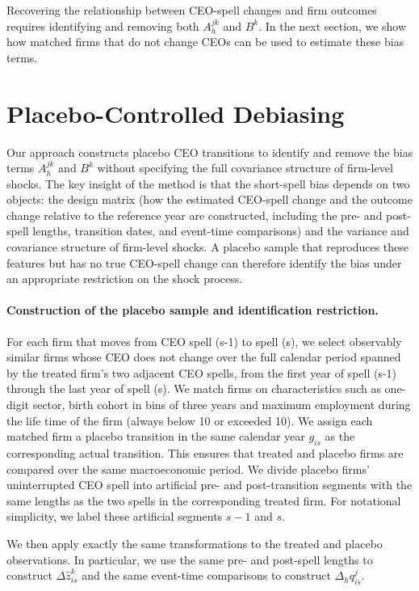 \documentclass[11pt,a4paper]{article}
\begin{document}
Recovering the relationship between CEO-spell changes and firm outcomes
requires identifying and removing both $A_h^{jk}$ and $B^{k}$. In the
next section, we show how matched firms that do not change CEOs can be
used to estimate these bias terms.


\section{Placebo-Controlled Debiasing}
\label{sec:placebo_debiasing}

Our approach constructs placebo CEO transitions to identify and remove
the bias terms $A_h^{jk}$ and $B^k$ without specifying the full
covariance structure of firm-level shocks. The key insight of the method is that the
short-spell bias depends on two objects: the design matrix (how the estimated CEO-spell
change and the outcome change relative to the reference year are
constructed, including the pre- and post-spell lengths, transition
dates, and event-time comparisons) and the variance and covariance
structure of firm-level shocks. A placebo sample that reproduces these
features but has no true CEO-spell change can therefore identify the
bias under an appropriate restriction on the shock process.

\paragraph{Construction of the placebo sample and identification
restriction.}
For each firm that moves from CEO spell (s-1) to spell (s), we select observably similar firms whose CEO does not change over the full calendar period spanned by the treated firm’s two adjacent CEO spells, from the first year of spell (s-1) through the last year of spell (s).
 We match firms on characteristics such as one-digit sector, birth cohort in bins of three years and maximum employment during the life time of the firm (always below 10 or exceeded 10). We assign each matched firm a placebo transition in
the same calendar year $g_{is}$ as the corresponding actual transition. This ensures
that treated and placebo firms are compared over the same macroeconomic
period.
We divide placebo firms' uninterrupted CEO spell into artificial pre- and
post-transition segments with the same lengths as the two spells in
the corresponding treated firm. For notational simplicity, we label
these artificial segments $s-1$ and $s$.

We then apply exactly the same transformations to the treated and
placebo observations. In particular, we use the same pre- and
post-spell lengths to construct $\Delta\widehat z_{is}^k$ and the same
event-time comparisons to construct $\Delta_h q_{is}^j$. 
\end{document}
